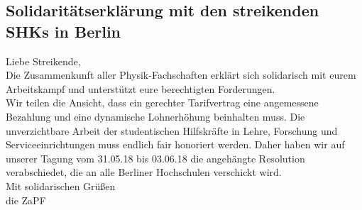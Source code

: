 
\subsection{Solidaritätserklärung	mit	den	streikenden	SHKs	in	Berlin}

Liebe	Streikende,\\

Die Zusammenkunft aller Physik-Fachschaften erklärt sich solidarisch mit eurem Arbeitskampf und unterstützt eure berechtigten Forderungen.\\

Wir	teilen	die	Ansicht,	dass	ein	gerechter	Tarifvertrag	eine	angemessene	Bezahlung	und	eine
dynamische	Lohnerhöhung	beinhalten	muss.	Die	unverzichtbare	Arbeit	der	studentischen
Hilfskräfte	in	Lehre,	Forschung	und	Serviceeinrichtungen	muss	endlich	fair honoriert	werden.
Daher	haben	wir	auf	unserer	Tagung	vom	31.05.18	bis	03.06.18	die	angehängte	Resolution
verabschiedet,	die	an	alle	Berliner	Hochschulen	verschickt	wird.\\

Mit	solidarischen Grüßen\\
die	ZaPF
